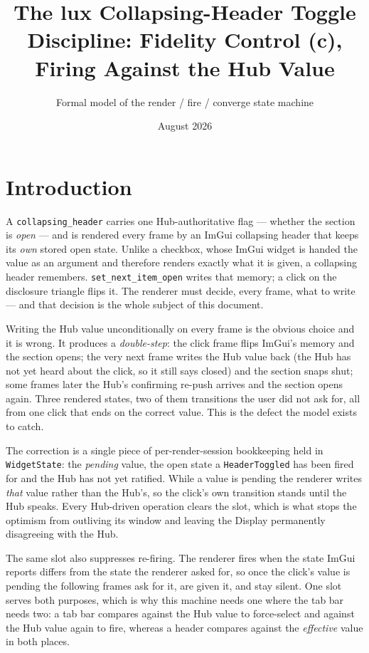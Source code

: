 \documentclass[a4paper,10pt,fleqn]{article}
\begin{document}
\title{The lux Collapsing-Header Toggle Discipline: Fidelity Control (c), Firing Against the Hub Value}
\author{Formal model of the render / fire / converge state machine}
\date{August 2026}
\maketitle

\section{Introduction}

A \texttt{collapsing\_header} carries one Hub-authoritative flag --- whether the
section is \emph{open} --- and is rendered every frame by an ImGui collapsing
header that keeps its \emph{own} stored open state.  Unlike a checkbox, whose
ImGui widget is handed the value as an argument and therefore renders exactly
what it is given, a collapsing header remembers.  \texttt{set\_next\_item\_open}
writes that memory; a click on the disclosure triangle flips it.  The renderer
must decide, every frame, what to write --- and that decision is the whole
subject of this document.

Writing the Hub value unconditionally on every frame is the obvious choice and
it is wrong.  It produces a \emph{double-step}: the click frame flips ImGui's
memory and the section opens; the very next frame writes the Hub value back
(the Hub has not yet heard about the click, so it still says closed) and the
section snaps shut; some frames later the Hub's confirming re-push arrives and
the section opens again.  Three rendered states, two of them transitions the
user did not ask for, all from one click that ends on the correct value.  This
is the defect the model exists to catch.

The correction is a single piece of per-render-session bookkeeping held in
\texttt{WidgetState}: the \emph{pending} value, the open state a
\texttt{HeaderToggled} has been fired for and the Hub has not yet ratified.
While a value is pending the renderer writes \emph{that} value rather than the
Hub's, so the click's own transition stands until the Hub speaks.  Every
Hub-driven operation clears the slot, which is what stops the optimism from
outliving its window and leaving the Display permanently disagreeing with the
Hub.

The same slot also suppresses re-firing.  The renderer fires when the state
ImGui reports differs from the state the renderer asked for, so once the click's
value is pending the following frames ask for it, are given it, and stay silent.
One slot serves both purposes, which is why this machine needs one where the
tab bar needs two: a tab bar compares against the Hub value to force-select and
against the Hub value again to fire, whereas a header compares against the
\emph{effective} value in both places.
\end{document}
